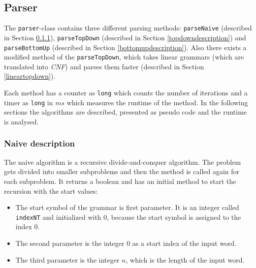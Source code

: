 \documentclass[a4paper, 11pt]{article}
\begin{document}

\subsection{Parser}
\label{parser}

The \texttt{parser}-class contains three different parsing methods: \texttt{parseNaive} (described in Section \ref{naivedescription}), \texttt{parseTopDown} (described in Section \ref{topdowndescription}) and \texttt{parseBottomUp} (described in Section \ref{bottomupdescription}). Also there exists a modified method of the \texttt{parseTopDown}, which takes linear grammars (which are translated into \textit{CNF}) and parses them faster (described in Section \ref{lineartopdown}).

Each method has a counter as \texttt{long} which counts the number of iterations and a timer as \texttt{long} in $ms$ which measures the runtime of the method. In the following sections the algorithms are described, presented as pseudo code and the runtime is analysed.


\subsubsection{Naive description}
\label{naivedescription}


The naive algorithm is a recursive divide-and-conquer algorithm. The problem gets divided into smaller subproblems and then the method is called again for each subproblem. It returns a boolean and has an initial method to start the recursion with the start values:
\begin{itemize}
\item The start symbol of the grammar is first parameter. It is an integer called \texttt{indexNT} and initialized with 0, because the start symbol is assigned to the index 0.
\item The second parameter is the integer 0 as a start index of the input word.
\item The third parameter is the integer $n$, which is the length of the input word.
\end{itemize} 
\end{document}

